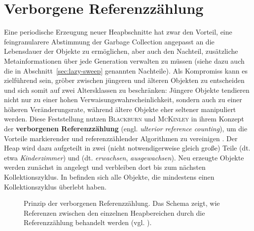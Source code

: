 

\section{Verborgene Referenzzählung}
\label{sec:ulterior}

Eine periodische Erzeugung neuer Heapbschnitte hat zwar den Vorteil, eine feingranularere Abstimmung der Garbage Collection angepasst an die Lebensdauer der Objekte zu ermöglichen, aber auch den Nachteil, zusätzliche Metainformationen über jede Generation verwalten zu müssen (siehe dazu auch die in Abschnitt~\ref{sec:lazy-sweep} genannten Nachteile).
Als Kompromiss kann es zielführend sein, gröber zwischen jüngeren und älteren Objekten zu entscheiden und sich somit auf zwei Altersklassen zu beschränken:
Jüngere Objekte tendieren nicht nur zu einer hohen Verwaisungswahrscheinlichkeit, sondern auch zu einer höheren Veränderungsrate, während ältere Objekte eher seltener manipuliert werden.
Diese Feststellung nutzen \textsc{Blackburn} und \textsc{McKinley} in ihrem Konzept der \textbf{verborgenen Referenzzählung} (engl. \textit{ulterior reference counting}), um die Vorteile markierender und referenzzählender Algorithmen zu vereinigen \cite{blackburn2003}.
Der Heap wird dazu aufgeteilt in zwei (nicht notwendigerweise gleich große) Teile \Nursery (dt. etwa \textit{Kinderzimmer}) und \Mature (dt. \textit{erwachsen}, \textit{ausgewachsen}).
Neu erzeugte Objekte werden zunächst in \Nursery angelegt und verbleiben dort bis zum nächsten Kollektionszyklus.
In \Mature befinden sich alle Objekte, die mindestens einen Kollektionszyklus überlebt haben.

\begin{figure}[h]
	\centering
	
	\caption[Prinzip der verborgenen Referenzzählung]{Prinzip der verborgenen Referenzzählung. Das Schema zeigt, wie Referenzen zwischen den einzelnen Heapbereichen durch die Referenzzählung behandelt werden (vgl. \cite[S. 346]{blackburn2003}).}
	\label{fig:ulterior-principle}
\end{figure}

